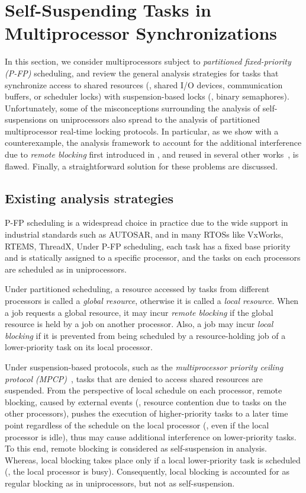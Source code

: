 \section{Self-Suspending Tasks in Multiprocessor Synchronizations}
\label{sec:syn}

In this section, we consider multiprocessors subject to \emph{partitioned fixed-priority (P-FP)} scheduling, and review the general analysis strategies for tasks that synchronize access to shared resources (\eg, shared I/O devices, communication buffers, or scheduler locks) with suspension-based locks (\eg, binary semaphores). Unfortunately, some of the misconceptions surrounding the analysis of self-suspensions on uniprocessors also spread to the analysis of partitioned multiprocessor real-time locking protocols. In particular, as we show with a counterexample, the analysis framework to account for the additional interference due to \emph{remote blocking} first introduced in \cite{lakshmanan-2009}, and reused in several other works~\cite{zeng-2011,bbb-2013,yang-2013,kim-2014,han-2014,carminati-2014,yang-2014},  is flawed. Finally, a straightforward solution for these problems are discussed. 

\subsection{Existing analysis strategies}
\label{sec:papers}

P-FP scheduling is a widespread choice in practice due to the wide support in industrial standards such as AUTOSAR, and in many RTOSs like VxWorks, RTEMS, ThreadX, \etc Under P-FP scheduling, each task has a fixed base priority and is statically assigned to a specific processor, and the tasks on each processors are scheduled as in uniprocessors. 

Under partitioned scheduling, a resource accessed by tasks from different processors is called a \emph{global resource}, otherwise it is called a \emph{local resource}. When a job requests a global resource, it may incur \emph{remote blocking} if the global resource is held by a job on another processor. Also, a job may incur \emph{local blocking} if it is prevented from being scheduled by a resource-holding job of a lower-priority task on its local processor. 

Under suspension-based protocols, such as the \emph{multiprocessor priority ceiling protocol (MPCP)}~\cite{rajkumar-1990}, tasks that are denied to access shared resources are suspended. From the perspective of local schedule on each processor, remote blocking, caused by external events (\ie, resource contention due to tasks on the other processors), pushes the execution of higher-priority tasks to a later time point regardless of the schedule on the local processor (\ie, even if the local processor is idle), thus may cause additional interference on lower-priority tasks. To this end, remote blocking is considered as self-suspension in analysis. Whereas, local blocking takes place only if a local lower-priority task is scheduled (\ie, the local processor is busy). Consequently, local blocking is accounted for as regular blocking as in uniprocessors, but not as self-suspension.

